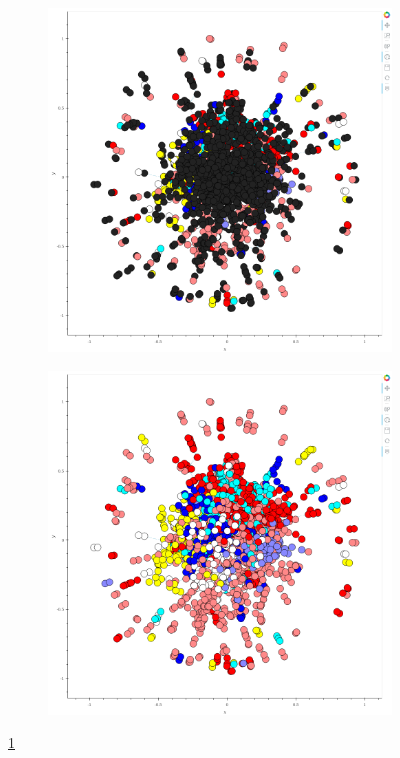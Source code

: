 \begin{figure}
	\centering
	\begin{subfigure}{0.4\textwidth} %
		\includegraphics[width=\textwidth]{media/labels_only_train.png}
		\caption{} %
        \label{fig:dataset_all}
	\end{subfigure}
	\vspace{1em} %
	\begin{subfigure}{0.4\textwidth} %
		\includegraphics[width=\textwidth]{media/labels_all.png}
        \caption{} %
        \label{fig:dataset_train}
	\end{subfigure}
	\caption{\ref{fig:dataset_all}} %
\end{figure}


